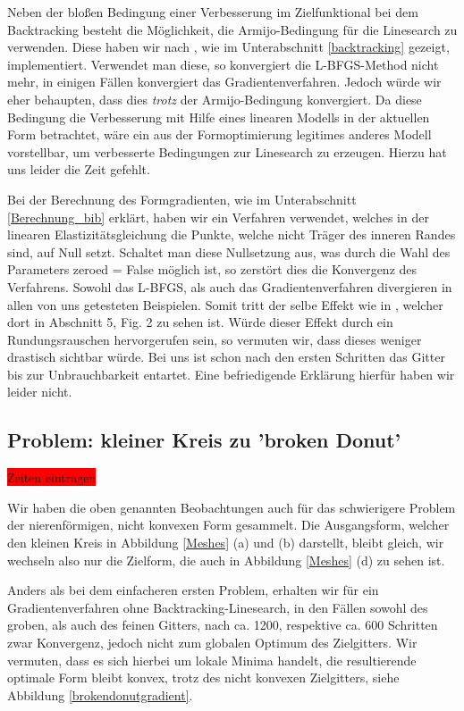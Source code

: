 Neben der bloßen Bedingung einer Verbesserung im Zielfunktional bei dem Backtracking besteht die Möglichkeit, die Armijo-Bedingung für die Linesearch zu verwenden. Diese haben wir nach \cite{Nocedal}, wie im Unterabschnitt  \ref{backtracking} gezeigt,  implementiert. Verwendet man diese, so konvergiert die L-BFGS-Method nicht mehr, in einigen Fällen konvergiert das Gradientenverfahren. Jedoch würde wir eher behaupten, dass dies \textit{trotz} der Armijo-Bedingung konvergiert. Da diese Bedingung die Verbesserung mit Hilfe eines linearen Modells in der aktuellen Form betrachtet, wäre ein aus der Formoptimierung legitimes anderes Modell vorstellbar, um verbesserte Bedingungen zur Linesearch zu erzeugen. Hierzu hat uns leider die Zeit gefehlt.

Bei der Berechnung des Formgradienten, wie im Unterabschnitt \ref{Berechnung_bib} erklärt, haben wir ein Verfahren verwendet, welches in der linearen Elastizitätsgleichung die Punkte, welche nicht Träger des inneren Randes sind, auf Null setzt. Schaltet man diese Nullsetzung aus, was durch die Wahl des Parameters \textsf{zeroed = False} möglich ist, so zerstört dies die Konvergenz des Verfahrens. Sowohl das L-BFGS, als auch das Gradientenverfahren divergieren in allen von uns getesteten Beispielen. Somit tritt der selbe Effekt wie in \cite{bfgs2}, welcher dort in Abschnitt 5, Fig. 2 zu sehen ist. Würde dieser Effekt durch ein Rundungsrauschen hervorgerufen sein, so vermuten wir, dass dieses weniger drastisch sichtbar würde. Bei uns ist schon nach den ersten Schritten das Gitter bis zur Unbrauchbarkeit entartet. Eine befriedigende Erklärung hierfür haben wir leider nicht.

\subsection{Problem: kleiner Kreis zu 'broken Donut'}\label{subsect_donut}

\colorbox{red}{Zeiten eintragen}

Wir haben die oben genannten Beobachtungen auch für das schwierigere Problem der nierenförmigen, nicht konvexen Form gesammelt. Die Ausgangsform, welcher den kleinen Kreis in Abbildung \ref{Meshes} (a) und (b) darstellt, bleibt gleich, wir wechseln also nur die Zielform, die auch in Abbildung \ref{Meshes} (d) zu sehen ist. 

Anders als bei dem einfacheren ersten Problem, erhalten wir für ein Gradientenverfahren ohne Backtracking-Linesearch, in den Fällen sowohl des groben, als auch des feinen Gitters, nach ca. 1200, respektive ca. 600 Schritten zwar Konvergenz, jedoch nicht zum globalen Optimum des Zielgitters. Wir vermuten, dass es sich hierbei um lokale Minima handelt, die resultierende optimale Form bleibt konvex, trotz des nicht konvexen Zielgitters, siehe Abbildung
\ref{brokendonutgradient}.

